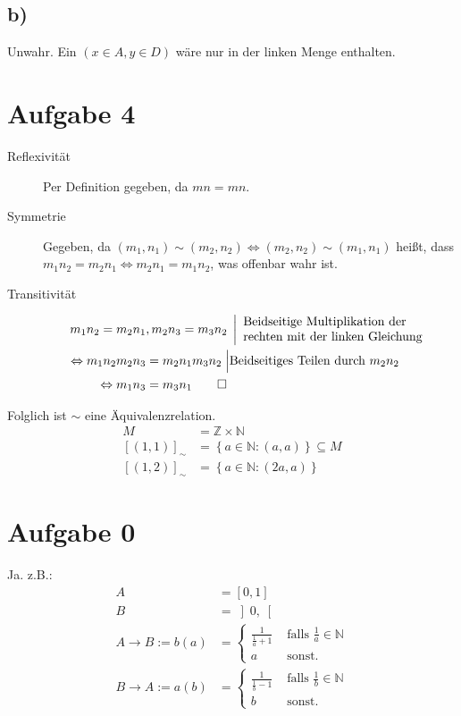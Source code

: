 \documentclass[12pt,a4paper,notitlepage]{article}
\newcommand{\aufgabe}[1]{\section*{\setcounter{section}{#1}Aufgabe #1}}
\begin{document}
\subsection*{b)}
Unwahr. Ein $(x\in A,y\in D)$ wäre nur in der linken Menge enthalten.
\aufgabe{4}
\begin{description}
\item[Reflexivität] Per Definition gegeben, da $mn=mn$.
\item[Symmetrie] Gegeben, da $(m_1,n_1)\sim(m_2,n_2)\Leftrightarrow(m_2,n_2)\sim(m_1,n_1)$ heißt, dass $m_1n_2=m_2n_1\Leftrightarrow m_2n_1=m_1n_2$, was offenbar wahr ist.
\item[Transitivität]
\begin{align}
m_1n_2=m_2n_1&,m_2n_3=m_3n_2\;\left|\begin{array}{l}\text{Beidseitige Multiplikation der}\\\text{rechten mit der linken Gleichung}\end{array}\right.\\
\Leftrightarrow m_1n_2m_2n_3&=m_2n_1m_3n_2\;\Big|\text{Beidseitiges Teilen durch }m_2n_2\\
\Leftrightarrow m_1n_3&=m_3n_1\qed
\end{align}
\end{description}
Folglich ist $\sim$ eine Äquivalenzrelation.
\begin{align}
M&=\mathbb Z\times\mathbb N\\
[(1,1)]_\sim&=\left\{a\in\mathbb N:(a,a)\right\}\subseteq M\\
[(1,2)]_\sim&=\left\{a\in\mathbb N:(2a,a)\right\}
\end{align}
\aufgabe{0}
Ja. z.B.:
\begin{align}
A&=\left[0,1\right]\\
B&=\left]0,\right[\\
A\rightarrow B:=b(a)&=\left\{\begin{array}{cl}\frac{1}{\frac{1}{a}+1}&\text{ falls }\frac{1}{a}\in\mathbb{N}\\a&\text{ sonst.}\end{array}\right.\\
B\rightarrow A:=a(b)&=\left\{\begin{array}{cl}\frac{1}{\frac{1}{b}-1}&\text{ falls }\frac{1}{b}\in\mathbb{N}\\b&\text{ sonst.}\end{array}\right.
\end{align}
\end{document}
